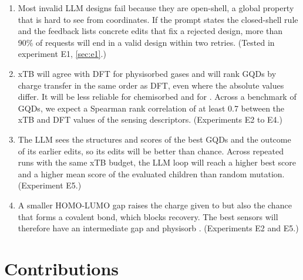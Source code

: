 \begin{enumerate}[label=\textbf{H\arabic*.},leftmargin=*]
  \item Most invalid LLM designs fail because they are open-shell, a global property that is hard
        to see from coordinates. If the prompt states the closed-shell rule and the feedback lists
        concrete edits that fix a rejected design, more than 90\% of requests will end in a valid
        design within two retries. (Tested in experiment E1, \cref{sec:e1}.)
  \item xTB will agree with DFT for physisorbed gases and will rank GQDs by charge transfer in
        the same order as DFT, even where the absolute values differ. It will be less reliable for
        chemisorbed  and for . Across a benchmark of GQDs, we expect a Spearman rank
        correlation of at least 0.7 between the xTB and DFT values of the sensing descriptors.
        (Experiments E2 to E4.)
  \item The LLM sees the structures and scores of the best GQDs and the outcome of its earlier
        edits, so its edits will be better than chance. Across repeated runs with the same xTB
        budget, the LLM loop will reach a higher best score and a higher mean score of the
        evaluated children than random mutation. (Experiment E5.)
  \item A smaller HOMO-LUMO gap raises the charge given to  but also the chance that
         forms a covalent bond, which blocks recovery. The best sensors will therefore have
        an intermediate gap and physisorb . (Experiments E2 and E5.)
\end{enumerate}

\section{Contributions}

